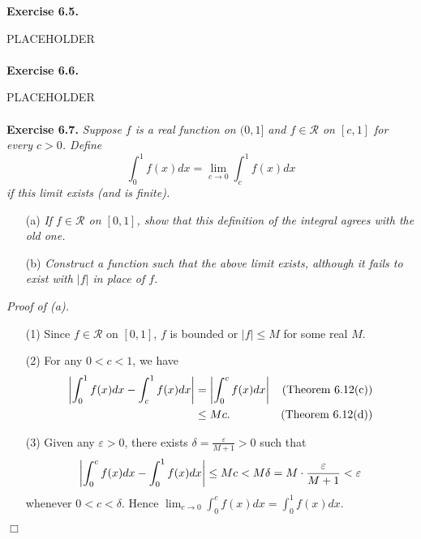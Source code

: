 \documentclass{article}
\begin{document}



\textbf{Exercise 6.5.}

PLACEHOLDER \\\\






\textbf{Exercise 6.6.}

PLACEHOLDER \\\\






\textbf{Exercise 6.7.}
\emph{Suppose $f$ is a real function on $(0,1]$ and $f \in \mathscr{R}$ on $[c,1]$
for every $c > 0$.
Define
\[
  \int_{0}^{1}f(x)dx = \lim_{c \to 0} \int_{c}^{1}f(x)dx
\]
if this limit exists (and is finite).}
\begin{enumerate}
  \item[(a)]
  \emph{If $f \in \mathscr{R}$ on $[0,1]$,
  show that this definition of the integral agrees with the old one.}

  \item[(b)]
  \emph{Construct a function such that the above limit exists,
  although it fails to exist with $|f|$ in place of $f$.} \\
\end{enumerate}

\emph{Proof of (a).}
\begin{enumerate}
\item[(1)]
  Since $f \in \mathscr{R}$ on $[0,1]$, $f$ is bounded or
  $|f| \leq M$ for some real $M$.

\item[(2)]
For any $0 < c < 1$,
we have
\begin{align*}
  \abs{ \int_{0}^{1} f(x)dx - \int_{c}^{1} f(x)dx }
  &= \abs{ \int_{0}^{c} f(x)dx }
    &\text{(Theorem 6.12(c))}\\
  &\leq Mc.
    &\text{(Theorem 6.12(d))}
\end{align*}

\item[(3)]
Given any $\varepsilon > 0$, there exists $\delta = \frac{\varepsilon}{M+1} > 0$
such that
\[
  \abs{ \int_{0}^{c} f(x)dx - \int_{0}^{1} f(x)dx }
  \leq Mc
  < M \delta
  = M \cdot \frac{\varepsilon}{M+1}
  < \varepsilon
\]
whenever $0 < c < \delta$.
Hence $\lim_{c \to 0} \int_{0}^{c} f(x)dx = \int_{0}^{1} f(x)dx$.
\end{enumerate}
$\Box$ \\
\end{document}
